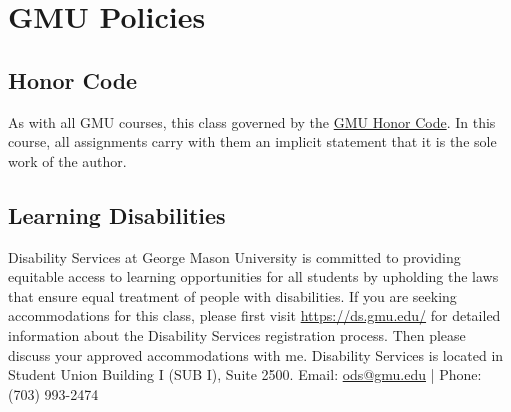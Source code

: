 \documentclass[11pt]{article}
\begin{document}
\section{GMU Policies}
\subsection{Honor Code}\label{sec:honor-code}

As with all GMU courses, this class governed by the \href{https://academicstandards.gmu.edu}{GMU Honor Code}. In this course, all assignments carry with them an implicit statement that it is the sole work of the author.

\subsection{Learning Disabilities}

Disability Services at George Mason University is committed to providing equitable access to learning opportunities for all students by upholding the laws that ensure equal treatment of people with disabilities. If you are seeking accommodations for this class, please first visit \url{https://ds.gmu.edu/} for detailed information about the Disability Services registration process. Then please discuss your approved accommodations with me. Disability Services is located in Student Union Building I (SUB I), Suite 2500. Email: \href{mailto:ods@gmu.edu}{ods@gmu.edu} | Phone: (703) 993-2474
\end{document}
